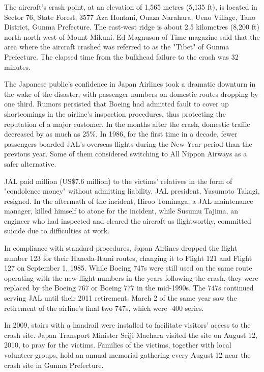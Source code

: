 \documentclass[a4paper,10pt]{article}
\begin{document}
The aircraft's crash point, at an elevation of 1,565 metres (5,135 ft), is located in Sector 76, State Forest, 3577 Aza Hontani, Ouaza Narahara, Ueno Village, Tano District, Gunma Prefecture. The east-west ridge is about 2.5 kilometres (8,200 ft) north north west of Mount Mikuni. Ed Magnuson of Time magazine said that the area where the aircraft crashed was referred to as the "Tibet" of Gunma Prefecture. The elapsed time from the bulkhead failure to the crash was 32 minutes.\par

The Japanese public's confidence in Japan Airlines took a dramatic downturn in the wake of the disaster, with passenger numbers on domestic routes dropping by one third. Rumors persisted that Boeing had admitted fault to cover up shortcomings in the airline's inspection procedures, thus protecting the reputation of a major customer. In the months after the crash, domestic traffic decreased by as much as 25\%. In 1986, for the first time in a decade, fewer passengers boarded JAL's overseas flights during the New Year period than the previous year. Some of them considered switching to All Nippon Airways as a safer alternative.\par

JAL paid  million (US\$7.6 million) to the victims' relatives in the form of "condolence money" without admitting liability. JAL president, Yasumoto Takagi, resigned. In the aftermath of the incident, Hiroo Tominaga, a JAL maintenance manager, killed himself to atone for the incident, while Susumu Tajima, an engineer who had inspected and cleared the aircraft as flightworthy, committed suicide due to difficulties at work.\par

In compliance with standard procedures, Japan Airlines dropped the flight number 123 for their Haneda-Itami routes, changing it to Flight 121 and Flight 127 on September 1, 1985. While Boeing 747s were still used on the same route operating with the new flight numbers in the years following the crash, they were replaced by the Boeing 767 or Boeing 777 in the mid-1990s. The 747s continued serving JAL until their 2011 retirement. March 2 of the same year saw the retirement of the airline's final two 747s, which were -400 series.\par

In 2009, stairs with a handrail were installed to facilitate visitors' access to the crash site. Japan Transport Minister Seiji Maehara visited the site on August 12, 2010, to pray for the victims. Families of the victims, together with local volunteer groups, hold an annual memorial gathering every August 12 near the crash site in Gunma Prefecture.\par
\end{document}
